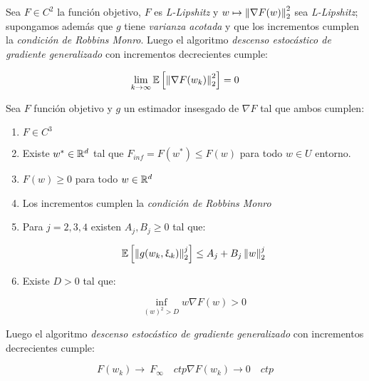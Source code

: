 \begin{theorem}
	Sea $F \in C^2$ la funci\'on objetivo, $F$ es \textit{L-Lipshitz} y $w \mapsto \left\lVert\nabla F (w)\right\rVert_2^2$ sea \textit{L-Lipshitz}; supongamos adem\'as que $g$ tiene \textit{varianza acotada} y que los incrementos cumplen la \textit{condici\'on de Robbins Monro}. Luego el algoritmo \textit{descenso estoc\'astico de gradiente generalizado} con incrementos decrecientes cumple:
	
	\begin{equation*}
	\lim\limits_{k \rightarrow \infty} \mathbb{E} \left[\left\lVert\nabla F (w_k)\right\rVert_2^2\right] = 0
	\end{equation*}
	
\end{theorem}

\begin{theorem}
	Sea $F$ funci\'on objetivo y  $g$ un estimador insesgado de $\nabla F$ tal que ambos cumplen:
	
		\begin{enumerate}
		\item $F \in C^3$
		\item Existe $w^* \in {\mathbb{R}}^d$ tal que $F_{inf} = F(w^*) \leq F(w)$ para todo $w \in U$ entorno.
		\item $F(w) \geq 0$ para todo $w \in {\mathbb{R}}^d$
		\item Los incrementos cumplen la \textit{condici\'on de Robbins Monro}
		\item Para $j = 2, 3, 4$ existen $A_j,B_j \geq 0$ tal que:
		
		\begin{equation*}
		\mathbb{E} \left[\left\lVert g(w_k, \upxi_{k})\right\rVert_2^j\right] \leq A_j + B_j \left\lVert w\right\rVert_2^j
		\end{equation*}
		
		\item  Existe $D > 0$ tal que:
		
		\begin{equation*}
		\inf\limits_{(w)^2 > D} {w \nabla F(w)} >0
		\end{equation*}
	\end{enumerate}
	
	
	Luego el algoritmo \textit{descenso estoc\'astico de gradiente generalizado} con incrementos decrecientes cumple:
	
	\begin{subequations}
		\begin{equation*}
		F(w_k) \rightarrow \ F_{\infty} \quad ctp
		\end{equation*}
		\begin{equation*}
		\nabla F(w_k) \rightarrow 0 \quad ctp
		\end{equation*}
	\end{subequations}
	
\end{theorem}